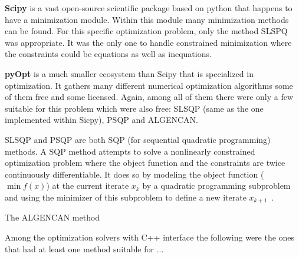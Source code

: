 \textbf{Scipy} is a vast open-source scientific package based on python that happens to have a minimization module. Within this module many minimization methods can be found. For this specific optimization problem, only the method SLSPQ was appropriate. It was the only one to handle constrained minimization where the constraints could be equations as well as inequations.

\textbf{pyOpt} is a much smaller ecosystem than Scipy that is specialized in optimization. It gathers many different numerical optimization algorithms some of them free and some licensed. Again, among all of them there were only a few suitable for this problem which were also free: SLSQP (same as the one implemented within Sicpy), PSQP and ALGENCAN.

SLSQP and PSQP are both SQP (for sequential quadratic programming) methods. A SQP method attempts to solve a nonlinearly constrained optimization problem where the object function and the constraints are twice continuously differentiable. It does so by modeling the object function ($\min f(x)$) at the current iterate $x_k$ by a quadratic programming subproblem and using the minimizer of this subproblem to define a new iterate $x_{k+1}$~\cite{Nocedal}.

The ALGENCAN method

Among the optimization solvers with C++ interface the following were the ones that had at least one method suitable for ...

